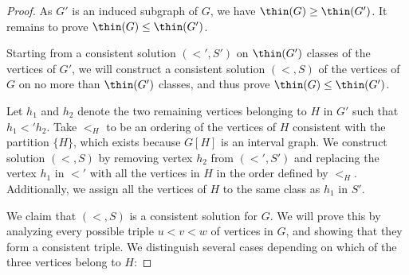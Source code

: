 \documentclass[11pt]{article}
\theoremstyle{plain}
\theoremstyle{definition}
\theoremstyle{remark}
\begin{document}
\begin{proof}
    As $G'$ is an induced subgraph of $G$, we have $\thin(G) \geq \thin(G')$. It remains to prove $\thin(G) \leq \thin(G')$.
    
    Starting from a consistent solution $(<', S')$ on $\thin(G')$ classes of the vertices of $G'$, we will construct a consistent solution $(<, S)$ of the vertices of $G$ on no more than $\thin(G')$ classes, and thus prove $\thin(G) \leq \thin(G')$.
    
    Let $h_1$ and $h_2$ denote the two remaining vertices belonging to $H$ in $G'$ such that $h_1 <' h_2$. Take $<_H$ to be an ordering of the vertices of $H$ consistent with the partition $\{H\}$, which exists because $G[H]$ is an interval graph. We construct solution $(<, S)$ by removing vertex $h_2$ from $(<', S')$ and replacing the vertex $h_1$ in $<'$ with all the vertices in $H$ in the order defined by $<_H$. Additionally, we assign all the vertices of $H$ to the same class as $h_1$ in $S'$. 
    
    We claim that $(<, S)$ is a consistent solution for $G$. We will prove this by analyzing every possible triple $u < v < w$ of vertices in $G$, and showing that they form a consistent triple. We distinguish several cases
    depending on which of the three vertices belong to $H$:


\end{proof}
\end{document}
